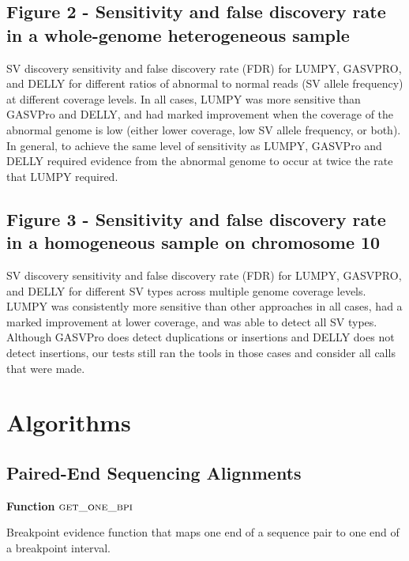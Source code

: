 \documentclass[10pt]{bmc_article}
\def\texttt{[image: ]}
\newenvironment{bmcformat}{\begin{raggedright}\baselineskip20pt\sloppy\setboolean{publ}{false}}{\end{raggedright}\baselineskip20pt\sloppy}
\begin{document}
\begin{bmcformat}
\subsection*{Figure 2 - Sensitivity and false discovery rate in a whole-genome
heterogeneous sample}
SV discovery sensitivity and false discovery rate (FDR) for LUMPY, GASVPRO, and
DELLY for different ratios of abnormal to normal reads (SV allele frequency) at
different coverage levels.  In all cases, LUMPY was more sensitive than GASVPro
and DELLY, and had marked improvement when the coverage of the abnormal
genome is low (either lower coverage, low SV allele frequency, or both).  In
general, to achieve the same level of sensitivity as LUMPY, GASVPro and DELLY
required evidence from the abnormal genome to occur at twice the rate that LUMPY
required. 


\subsection*{Figure 3 - Sensitivity and false discovery rate in a homogeneous
sample on chromosome 10}
SV discovery sensitivity and false discovery rate (FDR) for LUMPY, GASVPRO, and
DELLY for different SV types across multiple genome coverage levels.  LUMPY was
consistently more sensitive than other approaches in all cases, had a marked
improvement at lower coverage, and was able to detect all SV types.  Although
GASVPro does detect duplications or insertions and DELLY does not detect
insertions, our tests still ran the tools in those cases and consider all calls
that were made.


\section*{Algorithms}

\subsection*{Paired-End Sequencing Alignments}
\label{pe:sec}
\begin{algorithm}[H]
    \DontPrintSemicolon
    \footnotesize
    \BlankLine
    \textbf{Function} $\textsc{get\_one\_bpi}$\;
	\caption{Breakpoint evidence function that maps one end of a sequence pair
			to one end of a breakpoint interval.}
    \label{get_one_bpi}
\end{algorithm}


\end{bmcformat}
\end{document}
